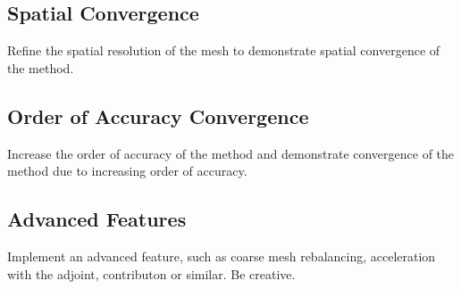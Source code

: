\documentclass[11pt]{exam}
\begin{document}
	\subsection{Spatial Convergence}

        Refine the spatial resolution of the mesh to 
        demonstrate spatial convergence of the method.

	\subsection{Order of Accuracy Convergence}
        
        Increase the order of accuracy of the method and demonstrate 
        convergence of the method due to increasing order of 
        accuracy.

	\subsection{Advanced Features}
        Implement an advanced feature, such as coarse mesh rebalancing, 
        acceleration with the adjoint, contributon or similar. Be creative.
\end{document}
